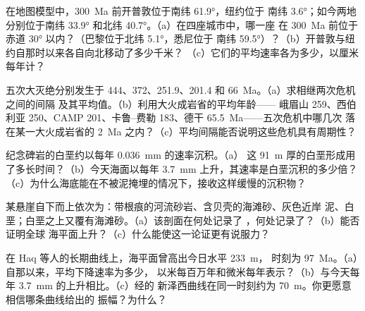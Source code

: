 \begin{exercise}[$\star$]\label{exo:b2:phanerozoic-earth:1}
在地图模型中，\qty{300}{Ma} 前开普敦位于南纬 \ang{61.9}，纽约位于
南纬 \ang{3.6}；如今两地分别位于南纬 \ang{33.9} 和北纬 \ang{40.7}。（a）在四座城市中，哪一座
在 \qty{300}{Ma} 前位于赤道 \ang{30} 以内？（巴黎位于北纬 \ang{5.1}，悉尼位于
南纬 \ang{59.5}）？（b）开普敦与纽约自那时以来各自向北移动了多少千米？
（c）它们的平均速率各为多少，以厘米每年计？
\end{exercise}

\begin{exercise}[$\star$]\label{exo:b2:phanerozoic-earth:2}
五次大灭绝分别发生于 444、372、251.9、201.4 和 \qty{66}{Ma}。（a）求相继两次危机之间的间隔
及其平均值。（b）利用大火成岩省的平均年龄——
峨眉山 259、西伯利亚 250、CAMP 201、卡鲁–费勒 183、德干 \qty{65.5}{Ma}——五次危机中哪几次
落在某一大火成岩省的 \qty{2}{Ma} 之内？（c）平均间隔能否说明这些危机具有周期性？
\end{exercise}

\begin{exercise}[$\star$]\label{exo:b2:phanerozoic-earth:3}
纪念碑岩的白垩约以每年 \qty{0.036}{mm} 的速率沉积。（a）
这 \qty{91}{m} 厚的白垩形成用了多长时间？（b）今天海面以每年 \qty{3.7}{mm} 上升，其速率是白垩沉积的多少倍？
（c）为什么海底能在不被泥掩埋的情况下，接收这样缓慢的沉积物？
\end{exercise}

\begin{exercise}[$\star$]\label{exo:b2:phanerozoic-earth:4}
某悬崖自下而上依次为：带根痕的河流砂岩、含贝壳的海滩砂、灰色近岸
泥、白垩；白垩之上又覆有海滩砂。（a）该剖面在何处记录了
，何处记录了？（b）能否证明全球
海平面上升？（c）什么能使这一论证更有说服力？
\end{exercise}

\begin{exercise}[$\star\star$]\label{exo:b2:phanerozoic-earth:5}
在 Haq 等人的长期曲线上，海平面曾高出今日水平 \qty{233}{m}，
时刻为 \qty{97}{Ma}。（a）自那以来，平均下降速率为多少，
以米每百万年和微米每年表示？（b）与今天每年 \qty{3.7}{mm} 的上升相比。（c）经的
新泽西曲线在同一时刻约为 \qty{70}{m}。你更愿意相信哪条曲线给出的
振幅？为什么？
\end{exercise}


